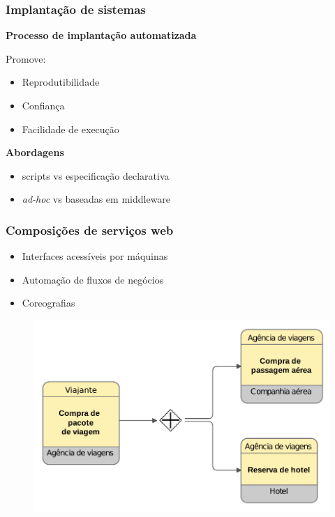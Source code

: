 \documentclass{beamer}
\newcommand\adhoc{\emph{ad-hoc}\xspace}
\newcommand\subtitulo[1]{{\large \textbf{#1}}}
\begin{document}

\begin{frame}
\frametitle{Implantação de sistemas}

\subtitulo{Processo de implantação automatizada}

\vspace{0.2cm}

Promove:

\begin{itemize}
\item Reprodutibilidade
\item Confiança
\item Facilidade de execução
\end{itemize}

\vspace{0.4cm}

\subtitulo{Abordagens}

\begin{itemize}
\item scripts vs especificação declarativa
\item \adhoc vs baseadas em middleware
\end{itemize}


\end{frame}


\begin{frame}
\frametitle{Composições de serviços web}

\begin{itemize}
\item Interfaces acessíveis por máquinas
\item Automação de fluxos de negócios
\item Coreografias
\end{itemize}

\begin{figure}
\includegraphics[width=0.7\linewidth]{img/bpmn2}
\end{figure}


\end{frame}
\end{document}
